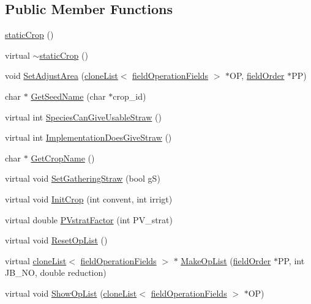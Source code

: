 \subsection*{Public Member Functions}
\begin{DoxyCompactItemize}
\item 
\hyperlink{classstatic_crop_ab27f8e19e723919d605c420136dc4b7c}{staticCrop} ()
\item 
virtual \hyperlink{classstatic_crop_a34f95010a196160c9e70f9156f25ad0d}{$\sim$staticCrop} ()
\item 
void \hyperlink{classstatic_crop_af589db4595808f2315dc1ab459b591d8}{SetAdjustArea} (\hyperlink{classclone_list}{cloneList}$<$ \hyperlink{classfield_operation_fields}{fieldOperationFields} $>$ $\ast$OP, \hyperlink{classfield_order}{fieldOrder} $\ast$PP)
\item 
char $\ast$ \hyperlink{classstatic_crop_a80471fa52dae39350ec58e3301df3790}{GetSeedName} (char $\ast$crop\_\-id)
\item 
virtual int \hyperlink{classstatic_crop_ab7763e4e6a0b9eff1788cb86ebad8170}{SpeciesCanGiveUsableStraw} ()
\item 
virtual int \hyperlink{classstatic_crop_a9e8458d1bb0bab4c9a7d05f47fe24537}{ImplementationDoesGiveStraw} ()
\item 
char $\ast$ \hyperlink{classstatic_crop_adfd949dba4aef73e87a04bbcb9bf3429}{GetCropName} ()
\item 
virtual void \hyperlink{classstatic_crop_af985797e339d5fe9a653f683b55c125a}{SetGatheringStraw} (bool gS)
\item 
virtual void \hyperlink{classstatic_crop_a695a960ba205046a899afa6e7f9fcee7}{InitCrop} (int convent, int irrigt)
\item 
virtual double \hyperlink{classstatic_crop_ae4f07498c1616eab212386faf352d348}{PVstratFactor} (int PV\_\-strat)
\item 
virtual void \hyperlink{classstatic_crop_a13c426c5863e78c744dbdee99c17f7a0}{ResetOpList} ()
\item 
virtual \hyperlink{classclone_list}{cloneList}$<$ \hyperlink{classfield_operation_fields}{fieldOperationFields} $>$ $\ast$ \hyperlink{classstatic_crop_a9b67ef1ae531a3afb32b63a4aeb5916b}{MakeOpList} (\hyperlink{classfield_order}{fieldOrder} $\ast$PP, int JB\_\-NO, double reduction)
\item 
virtual void \hyperlink{classstatic_crop_abfd60fc40149362ff07872a4258f39ec}{ShowOpList} (\hyperlink{classclone_list}{cloneList}$<$ \hyperlink{classfield_operation_fields}{fieldOperationFields} $>$ $\ast$OP)

\end{DoxyCompactItemize}
